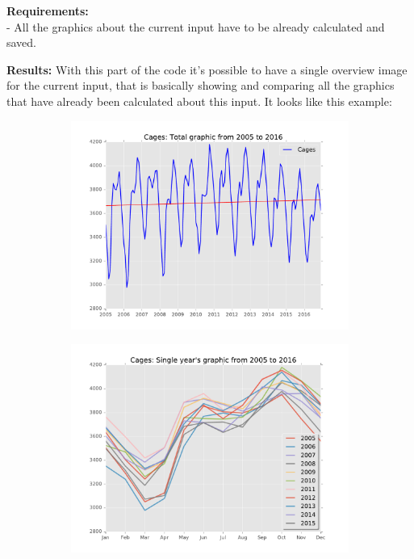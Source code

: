 \textbf{Requirements:}\\
- All the graphics about the current input have to be already calculated and saved.

\textbf{Results:}
With this part of the code it's possible to have a single overview image for the current input, that is basically showing and comparing all the graphics that have already been calculated about this input. It looks like this example:



\begin{figure}[H]
\begin{subfigure}{.5\textwidth}
	\centering
    \includegraphics[width=1\textwidth]{Files/Cages_Total.pdf}
    
\end{subfigure}%
\begin{subfigure}{.5\textwidth}
	\centering
    \includegraphics[width=1\textwidth]{Files/Cages_Years.pdf}
\end{subfigure}%
\end{figure} 


